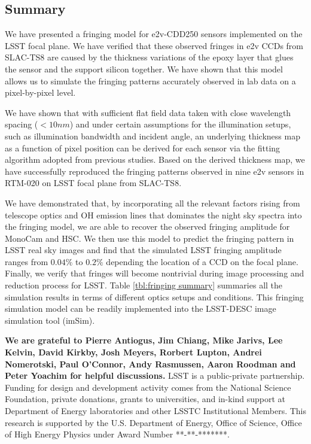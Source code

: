 \documentclass[twocolumn]{aastex63} %
\begin{document}
\begin{CJK*}{UTF8}{gbsn}

\section{Summary}
We have presented a fringing model for e2v-CDD250 sensors implemented on the LSST focal plane. We have verified that these observed fringes in e2v CCDs from SLAC-TS8 are caused by the thickness variations of the epoxy layer that glues the sensor and the support silicon together. We have shown that this model allows us to simulate the fringing patterns accurately observed in lab data on a pixel-by-pixel level. 

We have shown that with sufficient flat field data taken with close wavelength spacing ($< 10nm$) and under certain assumptions for the illumination setups, such as illumination bandwidth and incident angle, an underlying thickness map as a function of pixel position can be derived for each sensor via the fitting algorithm adopted from previous studies. Based on the derived thickness map, we have successfully reproduced the fringing patterns observed in nine e2v sensors in RTM-020 on LSST focal plane from SLAC-TS8. %

We have demonstrated that, by incorporating all the relevant factors rising from telescope optics and OH emission lines that dominates the night sky spectra into the fringing model, we are able to recover the observed fringing amplitude for MonoCam \citep{Brooks17} and HSC. We then use this model to predict the fringing pattern in LSST real sky images and find that the simulated LSST fringing amplitude ranges from $0.04\%$  to $0.2\%$ depending the location of a CCD on the focal plane. Finally, we verify that fringes will become nontrivial during image processing and reduction process for LSST. Table \ref{tbl:fringing summary} summaries all the simulation results in terms of different optics setups and conditions. This fringing simulation model can be readily implemented into the LSST-DESC image simulation tool (imSim).



\acknowledgements
\textbf{We are grateful to Pierre Antiogus, Jim Chiang, Mike Jarivs, Lee Kelvin, David Kirkby, Josh Meyers, Rorbert Lupton, Andrei Nomerotski, Paul O'Connor, Andy Rasmussen, Aaron Roodman and Peter Yoachim for helpful discussions.}
LSST is a public-private partnership. Funding for design and development activity comes from the National Science Foundation, private donations, grants to universities, and in-kind support at Department of Energy laboratories and other LSSTC Institutional Members. This research is supported by the U.S. Department of Energy, Office  of  Science,  Office  of  High  Energy  Physics  under Award Number **-**-*******.


\end{CJK*}
\end{document}
